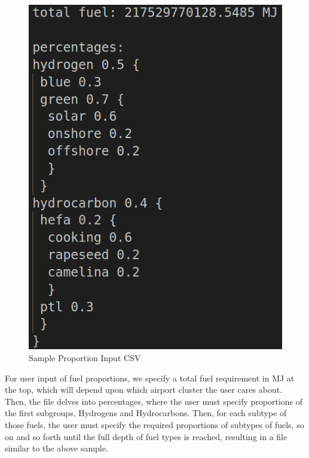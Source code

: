 \documentclass{article}
\begin{document}
\begin{figure}[H]
    \centering
    \includegraphics[scale=0.3]{figures/sample_prop_csv.png}
    \caption{Sample Proportion Input CSV}
    \label{fig:Sample Proportion CSV}
\end{figure}
For user input of fuel proportions, we specify a total fuel requirement in MJ at the top, which will depend upon which airport cluster the user cares about. Then, the file delves into percentages, where the user must specify proportions of the first subgroups, Hydrogens and Hydrocarbons. Then, for each subtype of those fuels, the user must specify the required proportions of subtypes of fuels, so on and so forth until the full depth of fuel types is reached, resulting in a file similar to the above sample.
\end{document}
